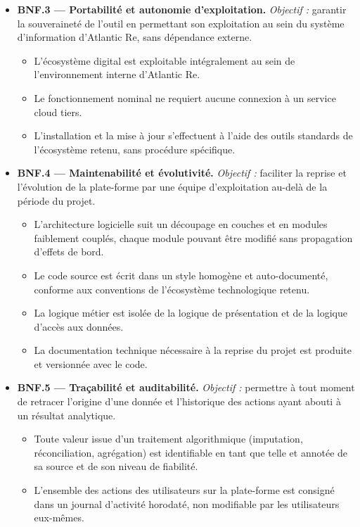 \documentclass[../main.tex]{subfiles}
\begin{document}
\begin{itemize}[leftmargin=1.5cm, itemsep=6pt]
  \item \textbf{BNF.3 --- Portabilité et autonomie d'exploitation.}
  \emph{Objectif :} garantir la souveraineté de l'outil en permettant son exploitation au sein du système d'information d'Atlantic Re, sans dépendance externe.
  \begin{itemize}[label=\textendash, itemsep=2pt]
    \item L'écosystème digital est exploitable intégralement au sein de l'environnement interne d'Atlantic Re.
    \item Le fonctionnement nominal ne requiert aucune connexion à un service cloud tiers.
    \item L'installation et la mise à jour s'effectuent à l'aide des outils standards de l'écosystème retenu, sans procédure spécifique.
  \end{itemize}

  \item \textbf{BNF.4 --- Maintenabilité et évolutivité.}
  \emph{Objectif :} faciliter la reprise et l'évolution de la plate-forme par une équipe d'exploitation au-delà de la période du projet.
  \begin{itemize}[label=\textendash, itemsep=2pt]
    \item L'architecture logicielle suit un découpage en couches et en modules faiblement couplés, chaque module pouvant être modifié sans propagation d'effets de bord.
    \item Le code source est écrit dans un style homogène et auto-documenté, conforme aux conventions de l'écosystème technologique retenu.
    \item La logique métier est isolée de la logique de présentation et de la logique d'accès aux données.
    \item La documentation technique nécessaire à la reprise du projet est produite et versionnée avec le code.
  \end{itemize}

  \item \textbf{BNF.5 --- Traçabilité et auditabilité.}
  \emph{Objectif :} permettre à tout moment de retracer l'origine d'une donnée et l'historique des actions ayant abouti à un résultat analytique.
  \begin{itemize}[label=\textendash, itemsep=2pt]
    \item Toute valeur issue d'un traitement algorithmique (imputation, réconciliation, agrégation) est identifiable en tant que telle et annotée de sa source et de son niveau de fiabilité.
    \item L'ensemble des actions des utilisateurs sur la plate-forme est consigné dans un journal d'activité horodaté, non modifiable par les utilisateurs eux-mêmes.
  \end{itemize}


\end{itemize}
\end{document}
